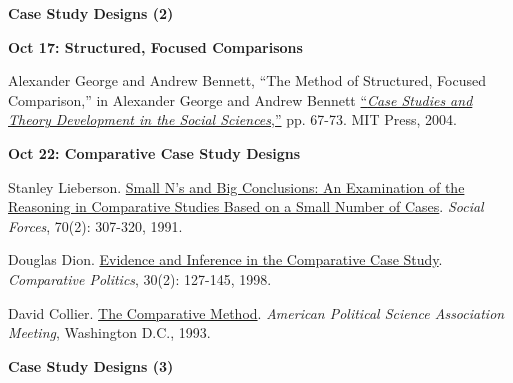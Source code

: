 \documentclass[letterpaper]{article}
\renewenvironment{itemize}{
  \begin{list}{}{
    \setlength{\leftmargin}{1.5em}
  }
}{
  \end{list}
}
\begin{document}
\begin{enumerate}
\item {\bf Case Study Designs (2)}
		
		\begin{itemize}
		\item {\bf Oct 17: Structured, Focused Comparisons}
			\begin{itemize}
				\item[$\bullet$] Alexander George and Andrew Bennett, ``The Method of Structured, Focused Comparison,'' in Alexander George and Andrew Bennett \href{https://www.alnap.org/system/files/content/resource/files/main/george-and-bennett-how-to-do-case-studies.pdf}{``\emph{Case Studies and Theory Development in the Social Sciences},''} pp. 67-73. MIT Press, 2004. %
			\end{itemize}
		\end{itemize}


		\begin{itemize}
		\item {\bf Oct 22: Comparative Case Study Designs}
			\begin{itemize}
				\item[$\bullet$] Stanley Lieberson. \href{http://www.jstor.org/stable/2580241}{Small N's and Big Conclusions: An Examination of the Reasoning in Comparative Studies Based on a Small Number of Cases}. \emph{Social Forces}, 70(2): 307-320, 1991. 
				\item[$\bullet$] Douglas Dion. \href{http://www.jstor.org/stable/422284}{Evidence and Inference in the Comparative Case Study}. \emph{Comparative Politics}, 30(2): 127-145, 1998.  %
				\item[$\bullet$] David Collier. \href{http://polisci.berkeley.edu/sites/default/files/people/u3827/APSA-TheComparativeMethod.pdf}{The Comparative Method}. \emph{American Political Science Association Meeting}, Washington D.C., 1993.
			\end{itemize}
		\end{itemize}


\item {\bf Case Study Designs (3)}


\end{enumerate}
\end{document}
